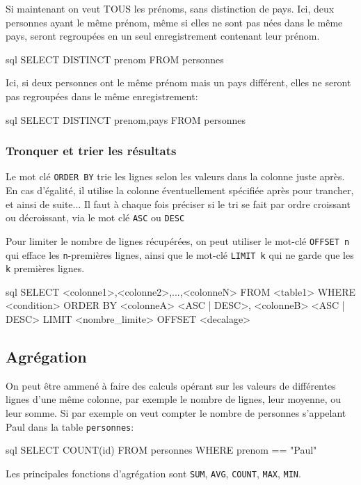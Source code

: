 \documentclass[a4paper]{scrartcl}
\begin{document}
				\exemple Si maintenant on veut TOUS les prénoms, sans distinction de pays. 
				Ici, deux personnes ayant le même prénom, même si elles ne sont pas nées dans le même pays, seront regroupées en un seul enregistrement contenant leur prénom.
				\begin{code}{sql}
					SELECT DISTINCT prenom
					FROM personnes
				\end{code}

				\exemple Ici, si deux personnes ont le même prénom mais un pays différent, elles ne seront pas regroupées dans le même enregistrement:
				\begin{code}{sql}
					SELECT DISTINCT prenom,pays
					FROM personnes
				\end{code}

			\subsubsection{Tronquer et trier les résultats}
				Le mot clé \texttt{ORDER BY} trie les lignes selon les valeurs dans la colonne juste après.
				En cas d'égalité, il utilise la colonne éventuellement spécifiée après pour trancher, et ainsi de suite...
				Il faut à chaque fois préciser si le tri se fait par ordre croissant ou décroissant, via le mot clé \texttt{ASC} ou \texttt{DESC}
				
				Pour limiter le nombre de lignes récupérées, on peut utiliser le mot-clé \texttt{OFFSET n} qui efface les \texttt{n}-premières lignes,
				ainsi que le mot-clé \texttt{LIMIT k} qui ne garde que les \texttt{k} premières lignes.

				\begin{code}{sql}
					SELECT <colonne1>,<colonne2>,...,<colonneN>
					FROM <table1>
					WHERE <condition>
					ORDER BY <colonneA> <ASC | DESC>, <colonneB> <ASC | DESC>
					LIMIT <nombre_limite>
					OFFSET <decalage>
				\end{code}

		\subsection{Agrégation}
			\semidef On peut être ammené à faire des calculs opérant sur les valeurs de différentes lignes d'une même colonne,
			par exemple le nombre de lignes, leur moyenne, ou leur somme.
			Si par exemple on veut compter le nombre de personnes s'appelant Paul dans la table \texttt{personnes}:			
			\begin{code}{sql}
				SELECT COUNT(id)
				FROM personnes
				WHERE prenom == "Paul"
			\end{code}
			Les principales fonctions d'agrégation sont \texttt{SUM}, \texttt{AVG}, \texttt{COUNT}, \texttt{MAX}, \texttt{MIN}.
\end{document}
